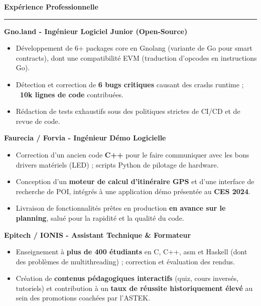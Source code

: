 \documentclass[9pt]{extarticle}
\begin{document}
\par\vspace{5pt}

{\large\bfseries Expérience Professionnelle}
\par\vspace{-8pt}
\rule{\linewidth}{0.4pt}
\par\vspace{5pt}

{\bfseries Gno.land - Ingénieur Logiciel Junior (Open-Source)}
\begin{itemize}[noitemsep, topsep=0pt]
	\item Développement de 6+ packages core en Gnolang (variante de Go pour smart contracts), dont une compatibilité EVM (traduction d'opcodes en instructions Go).
	\item Détection et correction de {\bfseries 6 bugs critiques} causant des crashs runtime ; {\bfseries ~10k lignes de code} contribuées.
	\item Rédaction de tests exhaustifs sous des politiques strictes de CI/CD et de revue de code.
\end{itemize}

\par\vspace{5pt}

{\bfseries Faurecia / Forvia - Ingénieur Démo Logicielle}
\begin{itemize}[noitemsep, topsep=0pt]
	\item Correction d'un ancien code {\bfseries C++} pour le faire communiquer avec les bons drivers matériels (LED) ; scripts Python de pilotage de hardware.
	\item Conception d'un {\bfseries moteur de calcul d'itinéraire GPS} et d'une interface de recherche de POI, intégrés à une application démo présentée au {\bfseries CES 2024}.
	\item Livraison de fonctionnalités prêtes en production {\bfseries en avance sur le planning}, salué pour la rapidité et la qualité du code.
\end{itemize}

\par\vspace{5pt}

{\bfseries Epitech / IONIS - Assistant Technique \& Formateur}
\begin{itemize}[noitemsep, topsep=0pt]
	\item Enseignement à {\bfseries plus de 400 étudiants} en C, C++, asm et Haskell (dont des problèmes de multithreading) ; correction et évaluation des rendus.
	\item Création de {\bfseries contenus pédagogiques interactifs} (quiz, cours inversés, tutoriels) et contribution à un {\bfseries taux de réussite historiquement élevé} au sein des promotions coachées par l'ASTEK.
\end{itemize}
\end{document}
